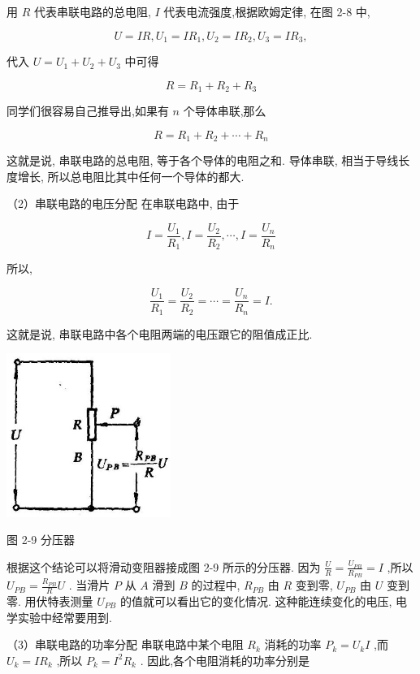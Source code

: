 \documentclass[10pt]{article}
\begin{document}
用 \(R\) 代表串联电路的总电阻, \(I\) 代表电流强度,根据欧姆定律, 在图 2-8 中,

\[
U = {IR},{U}_{1} = I{R}_{1},{U}_{2} = I{R}_{2},{U}_{3} = I{R}_{3},
\]

代入 \(U = {U}_{1} + {U}_{2} + {U}_{3}\) 中可得

\[
R = {R}_{1} + {R}_{2} + {R}_{3}
\]

同学们很容易自己推导出,如果有 \(n\) 个导体串联,那么

\[
R = {R}_{1} + {R}_{2} + \cdots + {R}_{n}
\]

这就是说, 串联电路的总电阻, 等于各个导体的电阻之和. 导体串联, 相当于导线长度增长, 所以总电阻比其中任何一个导体的都大.

（2）串联电路的电压分配 在串联电路中, 由于

\[
I = \frac{{U}_{1}}{{R}_{1}},I = \frac{{U}_{2}}{{R}_{2}},\cdots ,I = \frac{{U}_{n}}{{R}_{n}}
\]

所以,

\[
\frac{{U}_{1}}{{R}_{1}} = \frac{{U}_{2}}{{R}_{2}} = \cdots = \frac{{U}_{n}}{{R}_{n}} = I.
\]

这就是说, 串联电路中各个电阻两端的电压跟它的阻值成正比.

\begin{center}
\includegraphics[max width=0.4\textwidth]{images/01913056-1f15-74d8-9184-9aab52c9d66b_74_792724.jpg}
\end{center}

图 2-9 分压器

根据这个结论可以将滑动变阻器接成图 2-9 所示的分压器. 因为 \(\frac{U}{R} = \frac{{U}_{PB}}{{R}_{PB}} = I\) ,所以 \({U}_{PB} = \frac{{R}_{PB}}{R}U\) . 当滑片 \(P\) 从 \(A\) 滑到 \(B\) 的过程中, \({R}_{PB}\) 由 \(R\) 变到零, \({U}_{PB}\) 由 \(U\) 变到零. 用伏特表测量 \({U}_{PB}\) 的值就可以看出它的变化情况. 这种能连续变化的电压, 电学实验中经常要用到.

（3）串联电路的功率分配 串联电路中某个电阻 \({R}_{k}\) 消耗的功率 \({P}_{k} = {U}_{k}I\) ,而 \({U}_{k} = I{R}_{k}\) ,所以 \({P}_{k} = {I}^{2}{R}_{k}\) . 因此,各个电阻消耗的功率分别是
\end{document}
